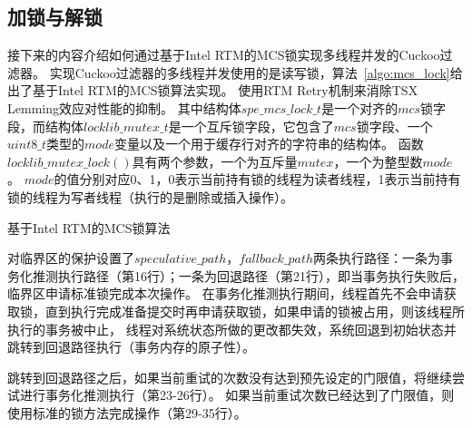 \subsection{加锁与解锁}
接下来的内容介绍如何通过基于Intel RTM的MCS锁实现多线程并发的Cuckoo过滤器。
实现Cuckoo过滤器的多线程并发使用的是读写锁，算法~\ref{algo:mcs_lock}给出了基于Intel RTM的MCS锁算法实现。
使用RTM Retry机制来消除TSX Lemming效应对性能的抑制。
其中结构体$spe\_mcs\_lock\_t$是一个对齐的$mcs$锁字段，而结构体$locklib\_mutex\_t$是一个互斥锁字段，它包含了$mcs$锁字段、一个$uint8\_t$类型的$mode$变量以及一个用于缓存行对齐的字符串的结构体。
函数$locklib\_mutex\_lock()$具有两个参数，一个为互斥量$mutex$，一个为整型数$mode$。
$mode$的值分别对应0、1，0表示当前持有锁的线程为读者线程，1表示当前持有锁的线程为写者线程（执行的是删除或插入操作）。
\begin{algorithm}[htbp]
\SetAlgoLined
\caption{基于Intel RTM的MCS锁算法}
\label{algo:mcs_lock}
\end{algorithm}
对临界区的保护设置了$speculative\_path$，$fallback\_path$两条执行路径：一条为事务化推测执行路径（第16行）；一条为回退路径（第21行），即当事务执行失败后，临界区申请标准锁完成本次操作。
在事务化推测执行期间，线程首先不会申请获取锁，直到执行完成准备提交时再申请获取锁，如果申请的锁被占用，则该线程所执行的事务被中止，
线程对系统状态所做的更改都失效，系统回退到初始状态并跳转到回退路径执行（事务内存的原子性）。

跳转到回退路径之后，如果当前重试的次数没有达到预先设定的门限值，将继续尝试进行事务化推测执行（第23-26行）。
如果当前重试次数已经达到了门限值，则使用标准的锁方法完成操作（第29-35行）。

